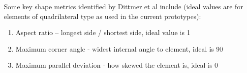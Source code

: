 \noindent
Some key shape metrics identified by Dittmer et al include (ideal values are for elements of quadrilateral type as used in  the current prototypes):

\begin{enumerate}[label=\Alph*]
\item Aspect ratio – longest side / shortest side, ideal value is 1
\item Maximum corner angle - widest internal angle to element, ideal is 90\degree
\item Maximum parallel deviation - how skewed the element is, ideal is 0\degree
\end{enumerate}